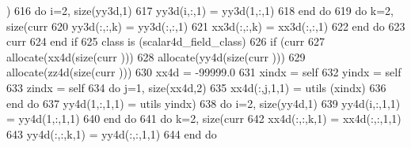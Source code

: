 \begin{DoxyCode}
      )%
616                 \textcolor{keywordflow}{do} i=2, \textcolor{keyword}{size}(yy3d,1)
617                     yy3d(i,:,1) = yy3d(1,:,1)
618 \textcolor{keywordflow}{                end do}
619                 \textcolor{keywordflow}{do} k=2, \textcolor{keyword}{size}(curr%
620                     yy3d(:,:,k) = yy3d(:,:,1)
621                     xx3d(:,:,k) = xx3d(:,:,1)
622 \textcolor{keywordflow}{                end do}
623                 curr%
624 \textcolor{keywordflow}{            end if}
625 \textcolor{keywordflow}{        class is} (scalar4d\_field\_class)
626             \textcolor{keywordflow}{if} (curr%
627                 \textcolor{keyword}{allocate}(xx4d(\textcolor{keyword}{size}(curr%
      )))
628                 \textcolor{keyword}{allocate}(yy4d(\textcolor{keyword}{size}(curr%
      )))
629                 \textcolor{keyword}{allocate}(zz4d(\textcolor{keyword}{size}(curr%
      )))
630                 xx4d = -99999.0
631                 xindx = self%
632                 yindx = self%
633                 zindx = self%
634                 \textcolor{keywordflow}{do} j=1, \textcolor{keyword}{size}(xx4d,2)
635                     xx4d(:,j,1,1) = utils%
      (xindx)%
636 \textcolor{keywordflow}{                end do}
637                 yy4d(1,:,1,1) = utils%
      yindx)%
638                 \textcolor{keywordflow}{do} i=2, \textcolor{keyword}{size}(yy4d,1)
639                     yy4d(i,:,1,1) = yy4d(1,:,1,1)
640 \textcolor{keywordflow}{                end do}
641                 \textcolor{keywordflow}{do} k=2, \textcolor{keyword}{size}(curr%
642                     xx4d(:,:,k,1) = xx4d(:,:,1,1)
643                     yy4d(:,:,k,1) = yy4d(:,:,1,1)
644 \textcolor{keywordflow}{                end do}

\end{DoxyCode}
